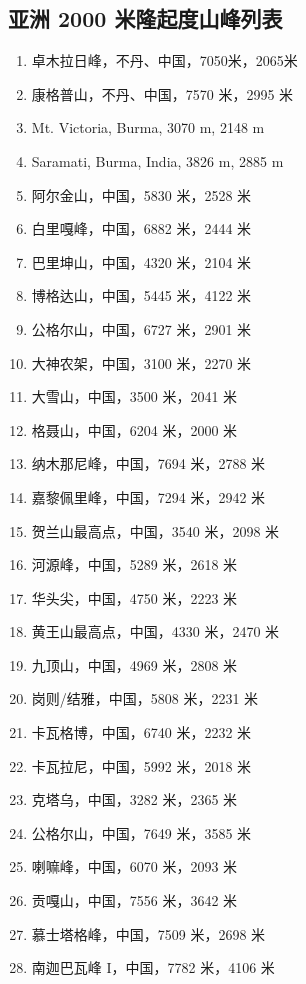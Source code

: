 \documentclass[10pt,twocolumn,letterpaper]{article}
\begin{document}
\subsection{亚洲 2000 米隆起度山峰列表}
\begin{flushleft}
\begin{enumerate}
    \item 卓木拉日峰，不丹、中国，7050米，2065米
    \item 康格普山，不丹、中国，7570 米，2995 米
    \item Mt. Victoria, Burma, 3070 m, 2148 m
    \item Saramati, Burma, India, 3826 m, 2885 m
    \item 阿尔金山，中国，5830 米，2528 米
    \item 白里嘎峰，中国，6882 米，2444 米
    \item 巴里坤山，中国，4320 米，2104 米
    \item 博格达山，中国，5445 米，4122 米
    \item 公格尔山，中国，6727 米，2901 米
    \item 大神农架，中国，3100 米，2270 米
    \item 大雪山，中国，3500 米，2041 米
    \item 格聂山，中国，6204 米，2000 米
    \item 纳木那尼峰，中国，7694 米，2788 米
    \item 嘉黎佩里峰，中国，7294 米，2942 米
    \item 贺兰山最高点，中国，3540 米，2098 米
    \item 河源峰，中国，5289 米，2618 米
    \item 华头尖，中国，4750 米，2223 米
    \item 黄王山最高点，中国，4330 米，2470 米
    \item 九顶山，中国，4969 米，2808 米
    \item 岗则/结雅，中国，5808 米，2231 米
    \item 卡瓦格博，中国，6740 米，2232 米
    \item 卡瓦拉尼，中国，5992 米，2018 米
    \item 克塔乌，中国，3282 米，2365 米
    \item 公格尔山，中国，7649 米，3585 米
    \item 喇嘛峰，中国，6070 米，2093 米
    \item 贡嘎山，中国，7556 米，3642 米
    \item 慕士塔格峰，中国，7509 米，2698 米
    \item 南迦巴瓦峰 I，中国，7782 米，4106 米

\end{enumerate}
\end{flushleft}
\end{document}
